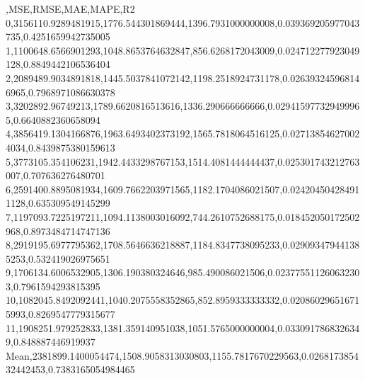 ,MSE,RMSE,MAE,MAPE,R2
0,3156110.9289481915,1776.544301869444,1396.7931000000008,0.039369205977043735,0.4251659942735005
1,1100648.6566901293,1048.8653764632847,856.6268172043009,0.024712277923049128,0.8849442106536404
2,2089489.9034891818,1445.5037841072142,1198.2518924731178,0.026393245968146965,0.7968971086630378
3,3202892.96749213,1789.6620816513616,1336.290666666666,0.029415977329499965,0.6640882360658094
4,3856419.1304166876,1963.6493402373192,1565.7818064516125,0.027138546270024034,0.8439875380159613
5,3773105.354106231,1942.4433298767153,1514.4081444444437,0.025301743212763007,0.707636276480701
6,2591400.8895081934,1609.7662203971565,1182.1704086021507,0.024204504284911128,0.635309549145299
7,1197093.7225197211,1094.1138003016092,744.2610752688175,0.018452050172502968,0.8973484714747136
8,2919195.6977795362,1708.5646636218887,1184.8347738095233,0.029093479441385253,0.532419026975651
9,1706134.6006532905,1306.190380324646,985.490086021506,0.023775511260632303,0.7961594293815395
10,1082045.8492092441,1040.2075558352865,852.8959333333332,0.020860296516715993,0.8269547779315677
11,1908251.979252833,1381.359140951038,1051.5765000000004,0.0330917868326349,0.848887446919937
Mean,2381899.1400054474,1508.9058313030803,1155.7817670229563,0.026817385432442453,0.7383165054984465
